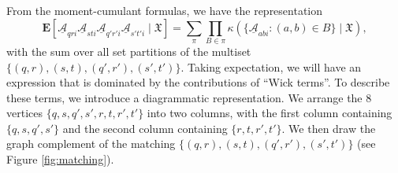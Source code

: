 \documentclass[letterpaper, 10pt, dvipsnames]{article}
\numberwithin{equation}{section}
\newcommand{\Au}{\underline{\mathcal{A}}}
\newcommand{\Eb}{\mathbf{E}}
\theoremstyle{definition}
\begin{document}
From the moment-cumulant formulas, we have the representation 
\begin{equation}\label{eq:Au-moment-cumulant}
\Eb\left[
  \Au_{qri}\Au_{sti}\Au_{q'r'i}\Au_{s't'i} \mid \mathfrak{X}
\right]
=\sum_{\pi} \prod_{B \in \pi} \kappa( \{ \Au_{abi} : (a,b) \in B \} \mid \mathfrak{X}),
\end{equation}
with the sum over all set partitions of the multiset $\{ (q,r), (s,t), (q',r'), (s',t') \}$.
Taking expectation, we will have an expression that is dominated by the contributions of ``Wick terms''.  To describe these terms, we introduce a diagrammatic representation.  We arrange the $8$ vertices $\{q,s,q',s',r,t,r',t'\}$ into two columns, with the first column containing $\{q,s,q',s'\}$ and the second column containing $\{r,t,r',t'\}$.  We then draw the graph complement of the matching $\{ (q,r), (s,t), (q',r'), (s',t') \}$ (see Figure \ref{fig:matching}).
\end{document}
